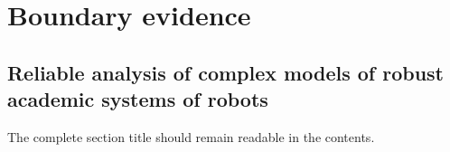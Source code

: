 \documentclass[english]{uestcthesis}
\begin{document}
\uestcfrontmatter
\uestctableofcontents
\uestcmainmatter
\setcounter{page}{100}
\setcounter{chapter}{9}
\chapter{Boundary evidence}
\setcounter{section}{9}
\section{Reliable analysis of complex models of robust academic systems of robots}
The complete section title should remain readable in the contents.
\end{document}
